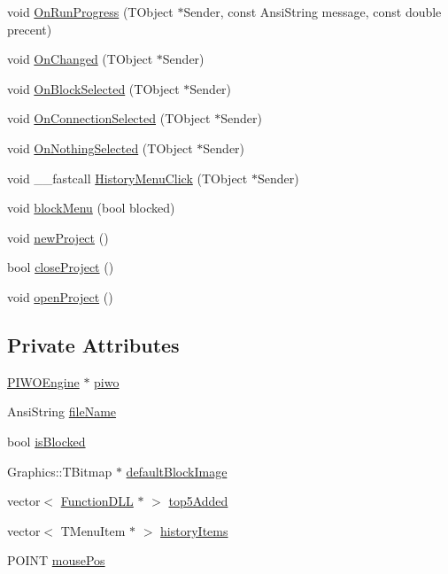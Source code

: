 \begin{CompactItemize}
\item 
void \hyperlink{classTForm1_34173b9dc2ccd99660a6a602eec607a4}{OnRunProgress} (TObject $\ast$Sender, const AnsiString message, const double precent)
\item 
void \hyperlink{classTForm1_a7224379c3a100f708cf83e57d021b85}{OnChanged} (TObject $\ast$Sender)
\item 
void \hyperlink{classTForm1_ac255960d6054a626a606621787a7d0f}{OnBlockSelected} (TObject $\ast$Sender)
\item 
void \hyperlink{classTForm1_dcc5e70c6599d92da32b110ba459978c}{OnConnectionSelected} (TObject $\ast$Sender)
\item 
void \hyperlink{classTForm1_42c28a6bc0602d30253e83d138bb4964}{OnNothingSelected} (TObject $\ast$Sender)
\item 
void \_\-\_\-fastcall \hyperlink{classTForm1_dfa4ff1b700ae559e155a6383d28f1be}{HistoryMenuClick} (TObject $\ast$Sender)
\item 
void \hyperlink{classTForm1_7e8d6ef0115bb7fcb6cb5f7c3bf23890}{blockMenu} (bool blocked)
\item 
void \hyperlink{classTForm1_e3e2982ce4ac87941997bca9b06ec934}{newProject} ()
\item 
bool \hyperlink{classTForm1_2a46f5c794da332c1e9dd55ac0c03834}{closeProject} ()
\item 
void \hyperlink{classTForm1_a776111b5ba217e343c407bf9bebc00b}{openProject} ()
\end{CompactItemize}
\subsection*{Private Attributes}
\begin{CompactItemize}
\item 
\hyperlink{classPIWOEngine}{PIWOEngine} $\ast$ \hyperlink{classTForm1_b49ba3dff8624f56cb0374f140e6479d}{piwo}
\item 
AnsiString \hyperlink{classTForm1_654ca370064b6939024e2b18eab9d582}{fileName}
\item 
bool \hyperlink{classTForm1_308a6fe8b59a83de7a6a1dfbc49be29e}{isBlocked}
\item 
Graphics::TBitmap $\ast$ \hyperlink{classTForm1_0c8e62274e3d29dc58ed0a6b05637771}{defaultBlockImage}
\item 
vector$<$ \hyperlink{classFunctionDLL}{FunctionDLL} $\ast$ $>$ \hyperlink{classTForm1_dc19047fa18712f475ad00bd336c91d8}{top5Added}
\item 
vector$<$ TMenuItem $\ast$ $>$ \hyperlink{classTForm1_a61aac6247f2779f856ceeb1133e6ff3}{historyItems}
\item 
POINT \hyperlink{classTForm1_427dabcbbd77fff9d3354f2849333b44}{mousePos}
\end{CompactItemize}


